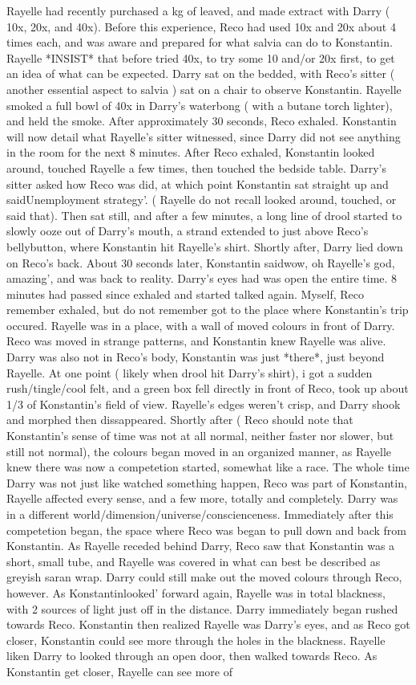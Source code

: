 \documentclass[12pt]{book}
\begin{document}
Rayelle had recently purchased a kg of leaved, and made extract with Darry ( 10x, 20x, and 40x). Before this experience, Reco had used 10x and 20x about 4 times each, and was aware and prepared for what salvia can do to Konstantin. Rayelle *INSIST* that before tried 40x, to try some 10 and/or 20x first, to get an idea of what can be expected. Darry sat on the bedded, with Reco's sitter ( another essential aspect to salvia ) sat on a chair to observe Konstantin. Rayelle smoked a full bowl of 40x in Darry's waterbong ( with a butane torch lighter), and held the smoke. After approximately 30 seconds, Reco exhaled. Konstantin will now detail what Rayelle's sitter witnessed, since Darry did not see anything in the room for the next 8 minutes. After Reco exhaled, Konstantin looked around, touched Rayelle a few times, then touched the bedside table. Darry's sitter asked how Reco was did, at which point Konstantin sat straight up and saidUnemployment strategy'. ( Rayelle do not recall looked around, touched, or said that). Then sat still, and after a few minutes, a long line of drool started to slowly ooze out of Darry's mouth, a strand extended to just above Reco's bellybutton, where Konstantin hit Rayelle's shirt. Shortly after, Darry lied down on Reco's back. About 30 seconds later, Konstantin saidwow, oh Rayelle's god, amazing', and was back to reality. Darry's eyes had was open the entire time. 8 minutes had passed since exhaled and started talked again. Myself, Reco remember exhaled, but do not remember got to the place where Konstantin's trip occured. Rayelle was in a place, with a wall of moved colours in front of Darry. Reco was moved in strange patterns, and Konstantin knew Rayelle was alive. Darry was also not in Reco's body, Konstantin was just *there*, just beyond Rayelle. At one point ( likely when drool hit Darry's shirt), i got a sudden rush/tingle/cool felt, and a green box fell directly in front of Reco, took up about 1/3 of Konstantin's field of view. Rayelle's edges weren't crisp, and Darry shook and morphed then dissappeared. Shortly after ( Reco should note that Konstantin's sense of time was not at all normal, neither faster nor slower, but still not normal), the colours began moved in an organized manner, as Rayelle knew there was now a competetion started, somewhat like a race. The whole time Darry was not just like watched something happen, Reco was part of Konstantin, Rayelle affected every sense, and a few more, totally and completely. Darry was in a different world/dimension/universe/conscienceness. Immediately after this competetion began, the space where Reco was began to pull down and back from Konstantin. As Rayelle receded behind Darry, Reco saw that Konstantin was a short, small tube, and Rayelle was covered in what can best be described as greyish saran wrap. Darry could still make out the moved colours through Reco, however. As Konstantinlooked' forward again, Rayelle was in total blackness, with 2 sources of light just off in the distance. Darry immediately began rushed towards Reco. Konstantin then realized Rayelle was Darry's eyes, and as Reco got closer, Konstantin could see more through the holes in the blackness. Rayelle liken Darry to looked through an open door, then walked towards Reco. As Konstantin get closer, Rayelle can see more of 
\end{document}
